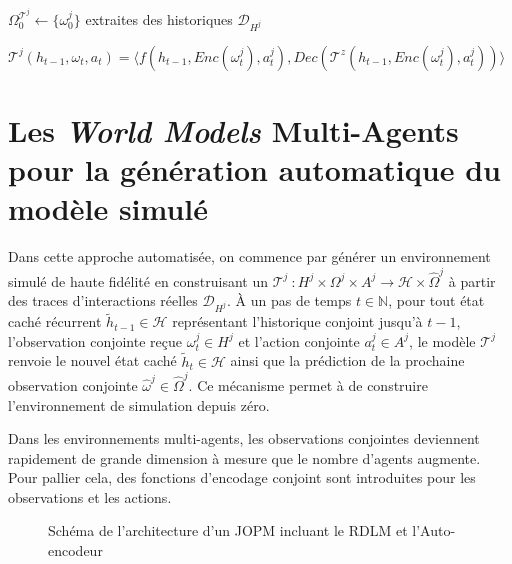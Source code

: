\begin{algorithm}[H]

  \vspace{0.5em}

  $\Omega^{\mathcal{T}^j}_0 \gets \{\omega^j_0\}$ extraites des historiques $\mathcal{D}_{H^j}$

  $\mathcal{T}^j(h_{t-1}, \omega_t, a_t) = \langle f(h_{t-1}, Enc(\omega^j_t), a^j_t), Dec(\mathcal{T}^{z}(h_{t-1}, Enc(\omega^j_t), a^j_t)) \rangle$ \;

  \vspace{0.5em}
\end{algorithm}


\section{Les \textit{World Models} Multi-Agents pour la génération automatique du modèle simulé}

Dans cette approche automatisée, on commence par générer un environnement simulé de haute fidélité en construisant un  $\mathcal{T}^j~: H^j \times \Omega^j \times A^j \rightarrow \mathcal{H} \times \hat{\Omega}^j$ à partir des traces d'interactions réelles $\mathcal{D}_{H^j}$. À un pas de temps $t \in \mathbb{N}$, pour tout état caché récurrent $\tilde{h}_{t-1} \in \mathcal{H}$ représentant l'historique conjoint jusqu'à $t-1$, l'observation conjointe reçue $\omega_t^j \in H^j$ et l'action conjointe $a_t^j \in A^j$, le modèle $\mathcal{T}^j$ renvoie le nouvel état caché $\tilde{h}_t \in \mathcal{H}$ ainsi que la prédiction de la prochaine observation conjointe $\hat{\omega}^j \in \hat{\Omega}^j$. Ce mécanisme permet à  de construire l'environnement de simulation depuis zéro.

Dans les environnements multi-agents, les observations conjointes deviennent rapidement de grande dimension à mesure que le nombre d'agents augmente. Pour pallier cela, des fonctions d'encodage conjoint sont introduites pour les observations et les actions.

\begin{figure}[h]
  \centering
  \resizebox{\textwidth}{!}{%
    
  }
  \caption{Schéma de l'architecture d'un JOPM incluant le RDLM et l'Auto-encodeur}
  \label{fig:jopm_architecture}
\end{figure}


